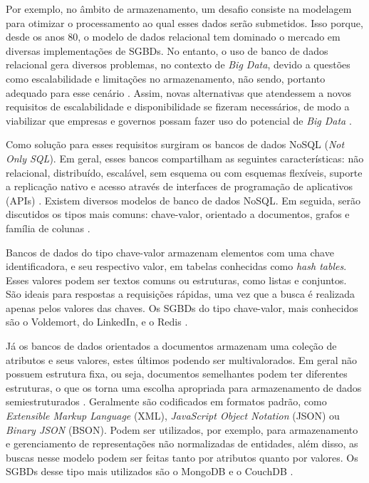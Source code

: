 Por exemplo, no âmbito de armazenamento, um desafio consiste na modelagem para otimizar o 
processamento ao qual esses dados serão submetidos. Isso porque, desde os anos 80, o modelo 
de dados relacional tem dominado o mercado em diversas implementações de SGBDs. No entanto, 
o uso de banco de dados relacional gera diversos problemas, no contexto de \textit{Big Data}, 
devido a questões como escalabilidade e limitações no armazenamento, não sendo, portanto 
adequado para esse cenário \cite{moniruzzaman2013nosql}. Assim, novas alternativas que 
atendessem a novos requisitos de escalabilidade e disponibilidade se fizeram necessários, de modo 
a viabilizar que empresas e governos possam fazer uso do potencial de \textit{Big Data} 
\cite{de2010nosql}.

Como solução para esses requisitos surgiram os bancos de dados NoSQL (\textit{Not Only SQL}). 
Em geral, esses bancos compartilham as seguintes características: não relacional, distribuído, 
escalável, sem esquema ou com esquemas flexíveis, suporte a replicação nativo e acesso 
através de interfaces de programação de aplicativos (APIs) \cite{de2010nosql}. 
Existem diversos modelos de banco de dados NoSQL. Em seguida, serão discutidos os tipos mais 
comuns: chave-valor, orientado a documentos, grafos e família de colunas 
\cite{de2010nosql}.

Bancos de dados do tipo chave-valor armazenam elementos com uma chave identificadora, e seu 
respectivo valor, em tabelas conhecidas como \textit{hash tables}. Esses valores podem ser 
textos comuns ou estruturas, como listas e conjuntos. São ideais para respostas a requisições 
rápidas, uma vez que a busca é realizada apenas pelos valores das chaves. Os SGBDs do
tipo chave-valor, mais conhecidos são o Voldemort, do LinkedIn, e o Redis \cite{moniruzzaman2013nosql}.

Já os bancos de dados orientados a documentos armazenam uma coleção de atributos e seus 
valores, estes últimos podendo ser multivalorados. Em geral não possuem estrutura fixa, 
ou seja, documentos semelhantes podem ter diferentes estruturas, o que os torna uma escolha 
apropriada para armazenamento de dados semiestruturados \cite{de2010nosql}. 
Geralmente são codificados em formatos padrão, como \textit{Extensible Markup Language} (XML), 
\textit{JavaScript Object Notation} (JSON) ou \textit{Binary JSON} (BSON).  Podem ser 
utilizados, por exemplo, para armazenamento e gerenciamento de representações não normalizadas 
de entidades, além disso, as buscas nesse modelo podem ser feitas tanto por atributos quanto 
por valores. Os SGBDs desse tipo mais utilizados são o MongoDB e o CouchDB 
\cite{moniruzzaman2013nosql}.


